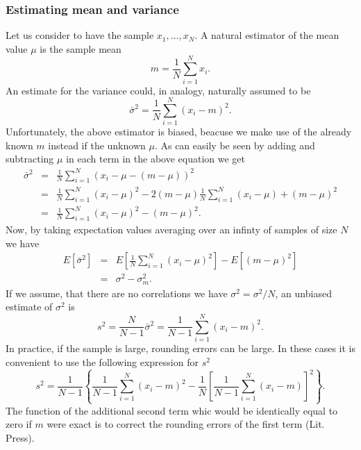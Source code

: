 \subsubsection{Estimating mean and variance}
Let us consider to have the sample $x_1, \ldots, x_N$. A natural
estimator of the mean value $\mu$ is the sample mean
\begin{equation*}
m= \frac{1}{N} \sum_{i=1}^N x_i.
\end{equation*}
An estimate for the variance could, in analogy, naturally assumed to
be
\begin{equation*}
  \bar{\sigma}^2 = \frac{1}{N} \sum_{i=1}^N (x_i -m)^2.
\end{equation*}
Unfortunately, the above estimator is biased, beacuse we make use of
the already known $m$ instead if the unknown $\mu$. As can easily be
seen
by adding and subtracting $\mu$ in each term in the above equation we
get
\begin {eqnarray*}
 \bar{\sigma}^2 &=& \frac{1}{N} \sum_{i=1}^N (x_i - \mu -(m-\mu))^2 \\
                & = & \frac{1}{N} \sum_{i=1}^N (x_i - \mu)^2
                              -2(m-\mu)\frac{1}{N} \sum_{i=1}^N (x_i
                                   - \mu)
                           +(m-\mu)^2 \\
               & = & \frac{1}{N} \sum_{i=1}^N (x_i - \mu)^2 - (m-\mu)^2.
\end{eqnarray*}
Now, by taking expectation values averaging over an infinty of samples
of size $N$ we have
\begin{eqnarray*}
E[\bar{\sigma}^2] &= & E\left[\frac{1}{N} \sum_{i=1}^N (x_i - \mu)^2
                                \right]
            - E\left[(m-\mu)^2 \right] \\
       & = & \sigma^2 - \sigma_m^2.
\end{eqnarray*}
If we assume, that there are no correlations we have $\sigma^2=
\sigma^2/N$, an unbiased estimate of $\sigma^2$ is
\begin{equation*}
s^2 = \frac{N}{N-1} \bar{\sigma}^2 = \frac{1}{N-1} \sum_{i=1}^N 
      (x_i - m)^2.
\end{equation*}
In practice, if the sample is large, rounding errors can be large. In
these cases it is convenient to use the following expression for $s^2$
\begin{equation*}
s^2 = \frac{1}{N-1} \left\{ \frac{1}{N-1} \sum_{i=1}^N 
      (x_i - m)^2 - \frac{1}{N} \left[ \frac{1}{N-1} \sum_{i=1}^N 
      (x_i - m) \right]^2  \right\}.
\end{equation*}
The function of the additional second term whic would be identically
equal to zero if $m$ were exact is to correct the rounding errors of
the first term (Lit. Press).


